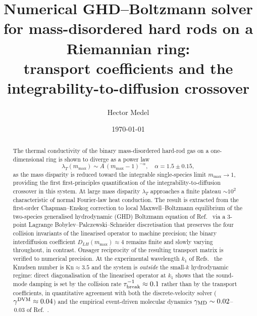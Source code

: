 \documentclass[aps,pre,twocolumn,superscriptaddress,longbibliography,floatfix]{revtex4-2}
\begin{document}
\title{Numerical GHD--Boltzmann solver for mass-disordered
hard rods on a Riemannian ring:\\
transport coefficients and the integrability-to-diffusion
crossover}

\author{Hector Medel}

\date{\today}

\begin{abstract}
The thermal conductivity of the binary mass-disordered
hard-rod gas on a one-dimensional ring is shown to diverge
as a power law
\begin{equation*}
\lambda_T(m_{\max}) \sim A\,(m_{\max}-1)^{-\alpha},
\quad \alpha = 1.5\pm 0.15,
\end{equation*}
as the mass disparity is reduced toward the integrable
single-species limit $m_{\max}\to 1$, providing the first
first-principles quantification of the
integrability-to-diffusion crossover in this system. At
large mass disparity $\lambda_T$ approaches a finite
plateau $\sim 10^2$ characteristic of normal Fourier-law
heat conduction. The result is extracted from the
first-order Chapman--Enskog correction to local
Maxwell--Boltzmann equilibrium of the two-species
generalised hydrodynamic (GHD) Boltzmann equation of
Ref.~\cite{PaperIV} via a 3-point Lagrange
Bobylev--Palczewski--Schneider discretisation that
preserves the four collision invariants of the linearised
operator to machine precision; the binary interdiffusion
coefficient $D_{LH}(m_{\max})\approx 4$ remains finite and
slowly varying throughout, in contrast. Onsager reciprocity
of the resulting transport matrix is verified to numerical
precision. At the experimental wavelength $k_1$ of
Refs.~\cite{PaperII,PaperIII} the Knudsen number is
$\mathrm{Kn}\approx 3.5$ and the system is \emph{outside}
the small-$k$ hydrodynamic regime: direct diagonalisation
of the linearised operator at $k_1$ shows that the
sound-mode damping is set by the collision rate
$\tau_{\rm break}^{-1}\approx 0.1$ rather than by the
transport coefficients, in quantitative agreement with
both the discrete-velocity solver
($\gamma^{\rm DVM}\approx 0.04$) and the empirical
event-driven molecular dynamics
$\gamma_{\rm MD}\sim 0.02$--$\,0.03$ of
Ref.~\cite{PaperII}.
\end{abstract}

\maketitle
\end{document}
